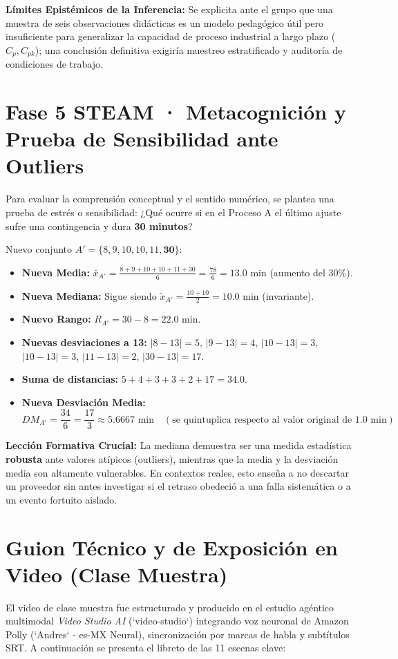 \documentclass[spanish,letterpaper,oneside]{article}
\begin{document}
\textbf{Límites Epistémicos de la Inferencia:} Se explicita ante el grupo que una muestra de seis observaciones didácticas es un modelo pedagógico útil pero insuficiente para generalizar la capacidad de proceso industrial a largo plazo ($C_p, C_{pk}$); una conclusión definitiva exigiría muestreo estratificado y auditoría de condiciones de trabajo.

\section{Fase 5 STEAM · Metacognición y Prueba de Sensibilidad ante Outliers}
Para evaluar la comprensión conceptual y el sentido numérico, se plantea una prueba de estrés o sensibilidad: ¿Qué ocurre si en el Proceso A el último ajuste sufre una contingencia y dura \textbf{30 minutos}?

Nuevo conjunto $A' = \{8, 9, 10, 10, 11, \mathbf{30}\}$:
\begin{itemize}
	\item \textbf{Nueva Media:} $\bar{x}_{A'} = \frac{8+9+10+10+11+30}{6} = \frac{78}{6} = 13.0\text{ min}$ (aumento del $30\%$).
	\item \textbf{Nueva Mediana:} Sigue siendo $\tilde{x}_{A'} = \frac{10+10}{2} = 10.0\text{ min}$ (invariante).
	\item \textbf{Nuevo Rango:} $R_{A'} = 30 - 8 = 22.0\text{ min}$.
	\item \textbf{Nuevas desviaciones a 13:} $|8-13|=5$, $|9-13|=4$, $|10-13|=3$, $|10-13|=3$, $|11-13|=2$, $|30-13|=17$.
	\item \textbf{Suma de distancias:} $5 + 4 + 3 + 3 + 2 + 17 = 34.0$.
	\item \textbf{Nueva Desviación Media:}
	\begin{equation*}
		DM_{A'} = \frac{34}{6} = \frac{17}{3} \approx 5.6667\text{ min} \quad (\text{se quintuplica respecto al valor original de 1.0 min})
	\end{equation*}
\end{itemize}

\textbf{Lección Formativa Crucial:} La mediana demuestra ser una medida estadística \textbf{robusta} ante valores atípicos (outliers), mientras que la media y la desviación media son altamente vulnerables. En contextos reales, esto enseña a no descartar un proveedor sin antes investigar si el retraso obedeció a una falla sistemática o a un evento fortuito aislado.

\section{Guion Técnico y de Exposición en Video (Clase Muestra)}
El video de clase muestra fue estructurado y producido en el estudio agéntico multimodal \textit{Video Studio AI} (`video-studio`) integrando voz neuronal de Amazon Polly (`Andres` - es-MX Neural), sincronización por marcas de habla y subtítulos SRT. A continuación se presenta el libreto de las 11 escenas clave:
\end{document}
